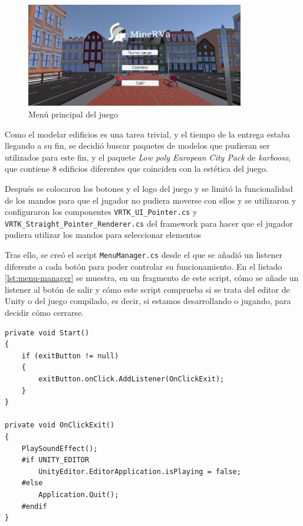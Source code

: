 \begin{figure}[!h]
\begin{center}
\includegraphics[width=0.85\textwidth]{imagenes/7/salas-unity/unity-menu.png}
\caption{Menú principal del juego}
\label{fig:main-menu}
\end{center}
\end{figure}

Como el modelar edificios es una tarea trivial, y el tiempo de la entrega estaba llegando a su fin, se decidió buscar paquetes de modelos que pudieran ser utilizados para este fin, y el paquete \textit{Low poly European City Pack} de \textit{karboosx}, que contiene 8 edificios diferentes que coinciden con la estética del juego.

Después se colocaron los botones y el logo del juego y se limitó la funcionalidad de los mandos para que el jugador no pudiera moverse con ellos y se utilizaron y configuraron los componentes \texttt{VRTK\_UI\_Pointer.cs} y \texttt{VRTK\_Straight\_Pointer\_Renderer.cs} del framework para hacer que el jugador pudiera utilizar los mandos para seleccionar elementos

Tras ello, se creó el script \texttt{MenuManager.cs} desde el que se añadió un listener diferente a cada botón para poder controlar su funcionamiento. En el listado \ref{lst:menu-manager} se muestra, en un fragmento de este script, cómo se añade un listener al botón de salir y cómo este script comprueba si se trata del editor de Unity o del juego compilado, es decir, si estamos desarrollando o jugando, para decidir cómo cerrarse.

\begin{lstlisting}[caption=Fragmento del script gestionar el menú, label=lst:menu-manager]
private void Start()
{
    if (exitButton != null)
    {
        exitButton.onClick.AddListener(OnClickExit);
    }
}

private void OnClickExit()
{
    PlaySoundEffect();
    #if UNITY_EDITOR
        UnityEditor.EditorApplication.isPlaying = false;
    #else
        Application.Quit();
    #endif
}
\end{lstlisting}

